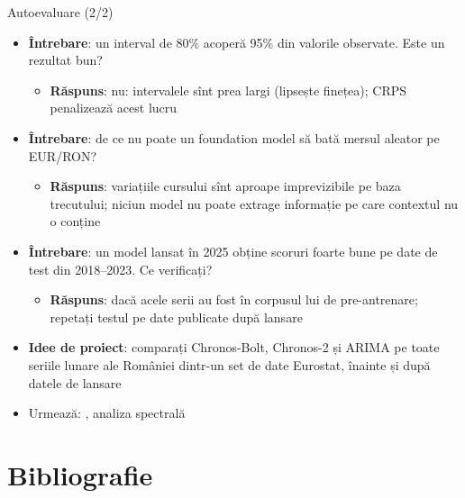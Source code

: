 \begin{frame}{Autoevaluare (2/2)}
\itemsize{\small}
\begin{itemize}
    \item \textbf{Întrebare}: un interval de 80\% acoperă 95\% din valorile observate. Este un rezultat bun?
    \begin{itemize}
        \item \textbf{Răspuns}: nu: intervalele sînt prea largi (lipsește finețea); CRPS penalizează acest lucru
    \end{itemize}
    \item \textbf{Întrebare}: de ce nu poate un foundation model să bată mersul aleator pe EUR/RON?
    \begin{itemize}
        \item \textbf{Răspuns}: variațiile cursului sînt aproape imprevizibile pe baza trecutului; niciun model nu poate extrage informație pe care contextul nu o conține
    \end{itemize}
    \item \textbf{Întrebare}: un model lansat în 2025 obține scoruri foarte bune pe date de test din 2018--2023. Ce verificați?
    \begin{itemize}
        \item \textbf{Răspuns}: dacă acele serii au fost în corpusul lui de pre-antrenare; repetați testul pe date publicate după lansare
    \end{itemize}
    \item \textbf{Idee de proiect}: comparați Chronos-Bolt, Chronos-2 și ARIMA pe toate seriile lunare ale României dintr-un set de date Eurostat, înainte și după datele de lansare
    \item Urmează: , analiza spectrală
\end{itemize}
\end{frame}


\section{Bibliografie}

